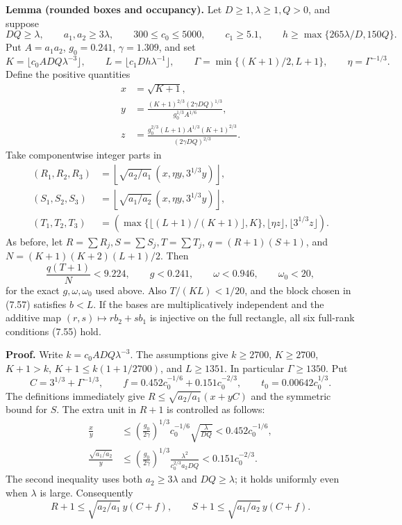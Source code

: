 \documentclass[
  11pt,
  a4paper,
]{article}
\begin{document}
\textbf{Lemma (rounded boxes and occupancy).} Let
\(D\ge1,\lambda\ge1,Q>0\), and suppose \[
DQ\ge\lambda,\qquad a_1,a_2\ge3\lambda,\qquad
300\le c_0\le5000,\qquad c_1\ge5.1,\qquad
h\ge\max\{265\lambda/D,150Q\}.
\] Put \(A=a_1a_2\), \(g_0=0.241\), \(\gamma=1.309\), and set \[
K=\lfloor c_0ADQ\lambda^{-3}\rfloor,\qquad
L=\lfloor c_1Dh\lambda^{-1}\rfloor,\qquad
\Gamma=\min\{(K+1)/2,L+1\},\qquad \eta=\Gamma^{-1/3}.
\] Define the positive quantities \[
\begin{aligned}
x&=\sqrt{K+1},\\
y&=\frac{(K+1)^{2/3}(2\gamma DQ)^{1/3}}{g_0^{1/3}A^{1/6}},\\
z&=\frac{g_0^{2/3}(L+1)A^{1/3}(K+1)^{2/3}}{(2\gamma DQ)^{2/3}}.
\end{aligned}
\] Take componentwise integer parts in \[
\begin{aligned}
(R_1,R_2,R_3)&=\left\lfloor\sqrt{a_2/a_1}\,(x,\eta y,3^{1/3}y)\right\rfloor,\\
(S_1,S_2,S_3)&=\left\lfloor\sqrt{a_1/a_2}\,(x,\eta y,3^{1/3}y)\right\rfloor,\\
(T_1,T_2,T_3)&=\left(\max\{\lfloor(L+1)/(K+1)\rfloor,K\},
                   \lfloor\eta z\rfloor,\lfloor3^{1/3}z\rfloor\right).
\end{aligned} \tag{7.59}
\] As before, let \(R=\sum R_j,S=\sum S_j,T=\sum T_j\),
\(q=(R+1)(S+1)\), and \(N=(K+1)(K+2)(L+1)/2\). Then \[
\frac{q(T+1)}N<9.224,\qquad
g<0.241,\qquad\omega<0.946,\qquad\omega_0<20,
\tag{7.60}
\] for the exact \(g,\omega,\omega_0\) used above. Also \(T/(KL)<1/20\),
and the block chosen in (7.57) satisfies \(b<L\). If the bases are
multiplicatively independent and the additive map
\((r,s)\mapsto rb_2+sb_1\) is injective on the full rectangle, all six
full-rank conditions (7.55) hold.

\textbf{Proof.} Write \(k=c_0ADQ\lambda^{-3}\). The assumptions give
\(k\ge2700\), \(K\ge2700\), \(K+1>k\), \(K+1\le k(1+1/2700)\), and
\(L\ge1351\). In particular \(\Gamma\ge1350\). Put \[
C=3^{1/3}+\Gamma^{-1/3},\qquad
f=0.452c_0^{-1/6}+0.151c_0^{-2/3},\qquad
t_0=0.00642c_0^{1/3}.
\] The definitions immediately give \(R\le\sqrt{a_2/a_1}(x+yC)\) and the
symmetric bound for \(S\). The extra unit in \(R+1\) is controlled as
follows: \[
\begin{aligned}
\frac{x}{y}&\le
\left(\frac{g_0}{2\gamma}\right)^{1/3}
c_0^{-1/6}\sqrt{\frac{\lambda}{DQ}}
<0.452c_0^{-1/6},\\
\frac{\sqrt{a_1/a_2}}y&\le
\left(\frac{g_0}{2\gamma}\right)^{1/3}
\frac{\lambda^2}{c_0^{2/3}a_2DQ}
<0.151c_0^{-2/3}.
\end{aligned}
\] The second inequality uses both \(a_2\ge3\lambda\) and
\(DQ\ge\lambda\); it holds uniformly even when \(\lambda\) is large.
Consequently \[
R+1\le\sqrt{a_2/a_1}\,y(C+f),\qquad
S+1\le\sqrt{a_1/a_2}\,y(C+f).
\]
\end{document}
